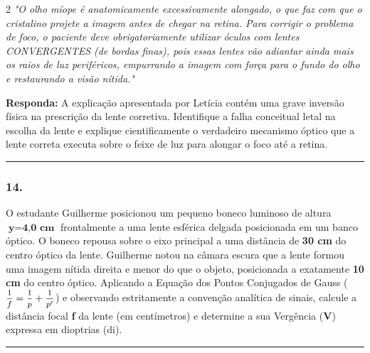 \documentclass[twoside, 10pt, a4paper]{article}
\newlength{\espacoPreQuestao}\setlength{\espacoPreQuestao}{0.1cm}
\newlength{\espacoQuestao}\setlength{\espacoQuestao}{0.2cm}
\begin{document}
\begin{multicols*}{2}
\textit{"O olho míope é anatomicamente excessivamente alongado, o que faz com que o cristalino projete a imagem antes de chegar na retina. Para corrigir o problema de foco, o paciente deve obrigatoriamente utilizar óculos com lentes CONVERGENTES (de bordas finas), pois essas lentes vão adiantar ainda mais os raios de luz periféricos, empurrando a imagem com força para o fundo do olho e restaurando a visão nítida."}
\begin{boxresponda}
\textbf{Responda:} A explicação apresentada por Letícia contém uma grave inversão física na prescrição da lente corretiva. Identifique a falha conceitual letal na escolha da lente e explique cientificamente o verdadeiro mecanismo óptico que a lente correta executa sobre o feixe de luz para alongar o foco até a retina.
\end{boxresponda}
\par\vspace{\espacoQuestao}

\noindent\textcolor{CorLinha}{\rule{\linewidth}{0.5pt}} 
\par\vspace{\espacoPreQuestao}
\subsubsection*{14.} O estudante Guilherme posicionou um pequeno boneco luminoso de altura $ \textbf{y} = \textbf{4,0 cm} $ frontalmente a uma lente esférica delgada posicionada em um banco óptico. O boneco repousa sobre o eixo principal a uma distância de \textbf{30 cm} do centro óptico da lente. Guilherme notou na câmara escura que a lente formou uma imagem nítida direita e menor do que o objeto, posicionada a exatamente \textbf{10 cm} do centro óptico. 
Aplicando a Equação dos Pontos Conjugados de Gauss ($ \mfrac{1}{f} = \mfrac{1}{p} + \mfrac{1}{p'} $) e observando estritamente a convenção analítica de sinais, calcule a distância focal \textbf{f} da lente (em centímetros) e determine a sua Vergência ($ \textbf{V} $) expressa em dioptrias (di).
\par\vspace{\espacoQuestao}

\noindent\textcolor{CorLinha}{\rule{\linewidth}{0.5pt}} 
\par\vspace{\espacoPreQuestao}

\end{multicols*}
\end{document}

